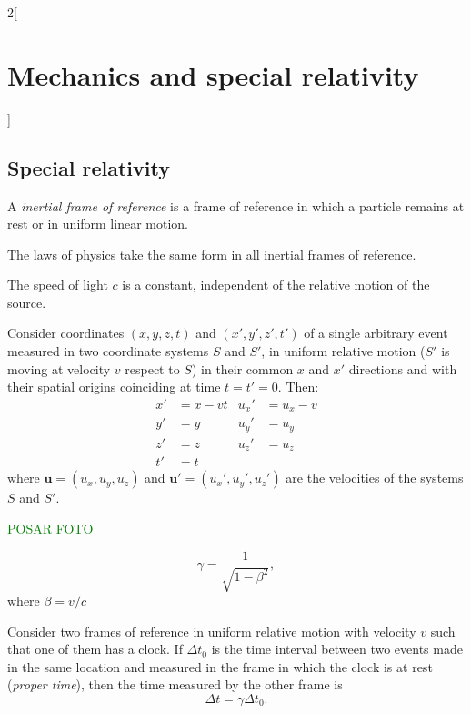 \documentclass[class=article,10pt,crop=false]{standalone}
\begin{document}
\begin{multicols}{2}[\section{Mechanics and special relativity}]
\subsection{Special relativity}
\begin{definition}
A \textit{inertial frame of reference} is a frame of reference in which a particle remains at rest or in uniform linear motion.
\end{definition}
\begin{concept}
The laws of physics take the same form in all inertial frames of reference.
\end{concept}
\begin{concept}
The speed of light $c$ is a constant, independent of the relative motion of the source.
\end{concept}
\begin{concept}
Consider coordinates $(x,y,z,t)$ and $(x',y',z',t')$ of a single arbitrary event measured in two coordinate systems $S$ and $S'$, in uniform relative motion ($S'$ is moving at velocity $v$ respect to $S$) in their common $x$ and $x'$ directions and  with their spatial origins coinciding at time $t=t'=0$. Then:
\begin{align*}
    x'&=x-vt & u_x'&=u_x-v\\
    y'&=y & u_y'&=u_y\\
    z'&=z & u_z'&=u_z\\
    t'&=t & &
\end{align*}
where $\boldsymbol{u}=(u_x,u_y,u_z)$ and $\boldsymbol{u'}=(u_x',u_y',u_z')$ are the velocities of the systems $S$ and $S'$.
\end{concept}
\textcolor{green}{POSAR FOTO}%
\begin{concept}
$$\gamma=\frac{1}{\sqrt{1-\beta^2}},$$ where $\beta=v/c$
\end{concept}
\begin{concept}
Consider two frames of reference in uniform relative motion with velocity $v$ such that one of them has a clock. If $\Delta t_0$ is the time interval between two events made in the same location and measured in the frame in which the clock is at rest (\textit{proper time}), then the time measured by the other frame is
$$\Delta t=\gamma\Delta t_0.$$
\end{concept}
\begin{concept}

\end{concept}
\end{multicols}
\end{document}
